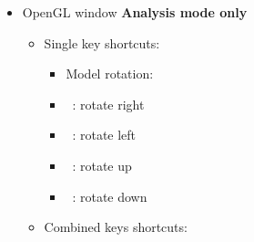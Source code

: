 {\begin{itemize}
\begin{itemize}
\begin{itemize}
\item Selection: \\
\item[] \Ctrl +  : select / unselect all atoms
\item[] \Ctrl +  : copy all selected atom(s)
\item[] \Ctrl +  : create new (empty project) \\
\item Misc: \\
\item[] \Ctrl +  : label / unlabel all atoms 
\item[] \Ctrl +  :  window [Sec.~\ref{ecw}]
\item[] \Ctrl +  :  dialog [Sec.~\ref{mdw}]
\item[] \Ctrl +  :  dialog [Sec.~\ref{rdw}]
\item[] \Ctrl +  : enter / exit fullscreen mode \\ 
\item Camero motion: \\
\item[] \Shift + \UArrow\ : zoom out
\item[] \Shift + \DArrow\ : zoom in \\
\end{itemize}
\end{itemize}
\item OpenGL window {\bf{Analysis mode only}}
\begin{itemize}
\item Single key shortcuts: \\
\begin{itemize}
\item Model rotation: \\
\item[] \RArrow\ : rotate right
\item[] \LArrow\ : rotate left
\item[] \UArrow\ : rotate up
\item[] \DArrow\ : rotate down \\
\end{itemize}
\newpage
\item Combined keys shortcuts: \\

\end{itemize}
\end{itemize}}
